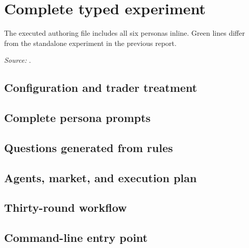 \clearpage
\section{Complete typed experiment}
The executed authoring file includes all six personas inline. Green lines differ from the standalone experiment in the previous report.
\par\textit{Source:} .
\def\activefile{experiment}
\subsection{Configuration and trader treatment}

\subsection{Complete persona prompts}

\subsection{Questions generated from rules}

\subsection{Agents, market, and execution plan}

\subsection{Thirty-round workflow}

\subsection{Command-line entry point}

